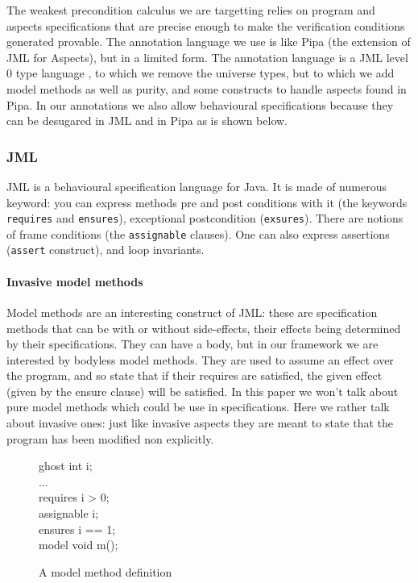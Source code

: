 The weakest precondition calculus we are targetting relies on program and aspects specifications that are
precise enough to make the verification conditions generated provable.
The annotation language we use is like Pipa \cite{ZhaoR03} (the extension
of JML for Aspects), but in a limited form. The annotation language is a JML level 0 type language 
\cite{Leavens-etal07}, to which
we remove the universe types, but to which we add model methods as well as purity, and some constructs
to handle aspects found in Pipa. In our annotations we also allow behavioural specifications
because they can be desugared in JML \cite{RaghavanL00} and in Pipa as is shown below.

\subsubsection{JML} JML is a behavioural specification language for Java. It is made of numerous keyword: you 
can express methods pre and post conditions with it (the keywords {\tt requires} and {\tt ensures}), exceptional
postcondition ({\tt exsures}). There
are notions of frame conditions (the {\tt assignable} clauses). One can also express assertions ({\tt assert} 
construct), and loop invariants.

\paragraph{Invasive model methods} 
Model methods are an interesting construct of JML: these are specification
methods that can be with or without side-effects, their effects being determined by their specifications.
They can have a body, but in our framework we are interested by bodyless model methods. They are used to 
assume an effect over the program, and so state that if their requires are satisfied, the given effect (given by
the ensure clause) will be satisfied.
In this paper we won't talk about pure model methods which could be use in specifications. Here we rather talk
about invasive ones: just like invasive aspects they are meant to state that the program has been modified 
non explicitly.
\begin{figure}
\begin{center}\begin{minipage}{3cm}
\bcode
ghost int i;\\
...\\
requires i > 0;\\
assignable i;\\
ensures i == 1;\\
model void m();
\ecode
\end{minipage}\end{center}
\caption{A model method definition}
\label{model_meth_def}
\end{figure}


